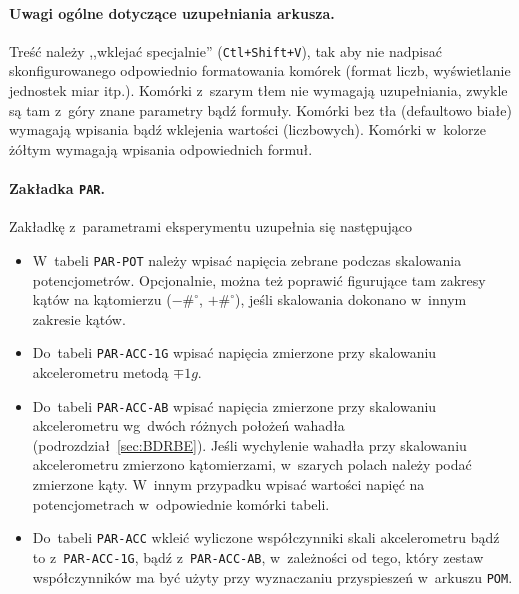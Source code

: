 \documentclass[paper=a4,DIV=12]{tmmlab}
\begin{document}
\paragraph{Uwagi ogólne dotyczące uzupełniania arkusza.} Treść należy
,,wklejać specjalnie'' (\texttt{Ctl+Shift+V}), tak aby nie nadpisać
skonfigurowanego odpowiednio formatowania komórek (format liczb, wyświetlanie
jednostek miar itp.). Komórki z~szarym tłem nie wymagają uzupełniania, zwykle
są tam z~góry znane parametry bądź formuły. Komórki bez tła (defaultowo białe)
wymagają wpisania bądź wklejenia wartości (liczbowych). Komórki w~kolorze
żółtym wymagają wpisania odpowiednich formuł.

\paragraph{Zakładka \texttt{PAR}.} Zakładkę z~parametrami eksperymentu
uzupełnia się następująco
\begin{itemize}
  \item W~tabeli \texttt{PAR-POT} należy wpisać napięcia zebrane podczas
    skalowania potencjometrów. Opcjonalnie, można też poprawić figurujące tam
    zakresy kątów na kątomierzu ($-\#^{\circ}$, $+\#^{\circ}$), jeśli
    skalowania dokonano w~innym zakresie kątów.
  \item Do~tabeli \texttt{PAR-ACC-1G} wpisać napięcia zmierzone przy
    skalowaniu akcelerometru metodą $\mp 1g$.
  \item Do~tabeli \texttt{PAR-ACC-AB} wpisać napięcia zmierzone przy skalowaniu
    akcelerometru wg~dwóch różnych położeń wahadła
    (podrozdział~\ref{sec:BDRBE}). Jeśli wychylenie wahadła przy skalowaniu
    akcelerometru zmierzono kątomierzami, w~szarych polach należy podać
    zmierzone kąty. W~innym przypadku wpisać wartości napięć na potencjometrach
    w~odpowiednie komórki tabeli.
  \item Do~tabeli \texttt{PAR-ACC} wkleić wyliczone współczynniki skali
    akcelerometru bądź to z~\texttt{PAR-ACC-1G}, bądź z~\texttt{PAR-ACC-AB},
    w~zależności od tego, który zestaw współczynników ma być użyty przy
    wyznaczaniu przyspieszeń w~arkuszu \texttt{POM}.
\end{itemize}
\end{document}
